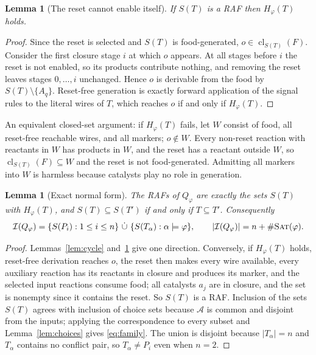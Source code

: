 \documentclass[11pt,a4paper]{article}
\theoremstyle{plain}
\newtheorem{lemma}[theorem]{Lemma}
\theoremstyle{definition}
\theoremstyle{remark}
\newcommand{\Irr}{\mathcal I}
\newcommand{\cl}{\operatorname{cl}}
\newcommand{\SAT}{\textup{\textsc{Sat}}}
\newcommand{\cA}{\mathcal A}
\begin{document}
\begin{lemma}[The reset cannot enable itself]\label{lem:reset}
If $S(T)$ is a RAF then $H_\varphi(T)$ holds.
\end{lemma}
\begin{proof}
Since the reset is selected and $S(T)$ is food-generated, $o\in\cl_{S(T)}(F)$. Consider the first closure stage $i$ at which $o$ appears. At all stages before $i$ the reset is not enabled, so its products contribute nothing, and removing the reset leaves stages $0,\dots,i$ unchanged. Hence $o$ is derivable from the food by $S(T)\setminus\{A_q\}$. Reset-free generation is exactly forward application of the signal rules to the literal wires of $T$, which reaches $o$ if and only if $H_\varphi(T)$.
\end{proof}

An equivalent closed-set argument: if $H_\varphi(T)$ fails, let $W$ consist of food, all reset-free reachable wires, and all markers; $o\notin W$. Every non-reset reaction with reactants in $W$ has products in $W$, and the reset has a reactant outside $W$, so $\cl_{S(T)}(F)\subseteq W$ and the reset is not food-generated. Admitting all markers into $W$ is harmless because catalysts play no role in generation.

\begin{lemma}[Exact normal form]\label{lem:normal}
The RAFs of $Q_\varphi$ are exactly the sets $S(T)$ with $H_\varphi(T)$, and $S(T)\subseteq S(T')$ if and only if $T\subseteq T'$. Consequently
\begin{equation}\label{eq:family}
 \Irr(Q_\varphi)=\{S(P_i):1\le i\le n\}\ \dot\cup\ \{S(T_\alpha):\alpha\models\varphi\},
 \qquad |\Irr(Q_\varphi)|=n+\#\SAT(\varphi).
\end{equation}
\end{lemma}
\begin{proof}
Lemmas~\ref{lem:cycle} and~\ref{lem:reset} give one direction. Conversely, if $H_\varphi(T)$ holds, reset-free derivation reaches $o$, the reset then makes every wire available, every auxiliary reaction has its reactants in closure and produces its marker, and the selected input reactions consume food; all catalysts $a_j$ are in closure, and the set is nonempty since it contains the reset. So $S(T)$ is a RAF. Inclusion of the sets $S(T)$ agrees with inclusion of choice sets because $\cA$ is common and disjoint from the inputs; applying the correspondence to every subset and Lemma~\ref{lem:choices} gives \eqref{eq:family}. The union is disjoint because $|T_\alpha|=n$ and $T_\alpha$ contains no conflict pair, so $T_\alpha\neq P_i$ even when $n=2$.
\end{proof}
\end{document}
